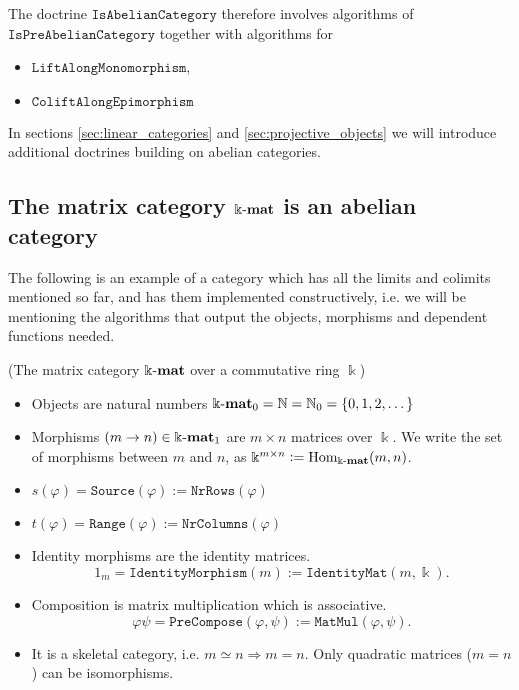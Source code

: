 \begin{doctrine}
The doctrine $\mathtt{IsAbelianCategory}$ therefore involves algorithms of $\mathtt{IsPreAbelianCategory}$ together with algorithms for
\begin{itemize}
\item $\mathtt{LiftAlongMonomorphism}$,
\item $\mathtt{ColiftAlongEpimorphism}$
\end{itemize}
\end{doctrine}

In sections \ref{sec:linear_categories} and \ref{sec:projective_objects} we will introduce additional doctrines building on abelian categories.

\subsection{The matrix category $\Bbbk\textnormal{-}\mathbf{mat}$ is an abelian category}

The following is an example of a category which has all the limits and colimits mentioned so far, and has them implemented constructively,
i.e. we will be mentioning the algorithms that output the objects, morphisms and dependent functions needed.

\begin{example}{(The matrix category $\Bbbk\textnormal{-}\mathbf{mat}$ over a commutative ring $\Bbbk$)}\label{ex:kmat_skeletal}
\begin{itemize}
\item Objects are natural numbers $\Bbbk\textnormal{-}\mathbf{mat}_{0} = \mathbb{N} = \mathbb{N}_{0} = \{0,1,2,\dots\}$
\item Morphisms $(m \rightarrow n) \in \Bbbk\textnormal{-}\mathbf{mat}_{1}$ are $m \times n$ matrices over $\Bbbk$.
We write the set of morphisms between $m$ and $n$, as $\Bbbk^{m\times n} := \textup{Hom}_{\Bbbk\textnormal{-}\mathbf{mat}}(m,n)$. 
\item $s(\varphi) = \mathtt{Source}(\varphi) := \mathtt{NrRows}(\varphi)$
\item $t(\varphi) = \mathtt{Range}(\varphi) := \mathtt{NrColumns}(\varphi)$
\item Identity morphisms are the identity matrices.
\[
1_{m} = \mathtt{IdentityMorphism}(m) := \mathtt{IdentityMat}(m,\Bbbk).
\]
\item Composition is matrix multiplication which is associative.
\[
\varphi\psi = \mathtt{PreCompose}(\varphi,\psi) := \mathtt{MatMul}(\varphi,\psi).
\]
\item It is a skeletal category, i.e. $m \simeq n \Rightarrow m = n$. Only quadratic matrices ($m = n$) can be
isomorphisms.
\end{itemize}
\end{example}

